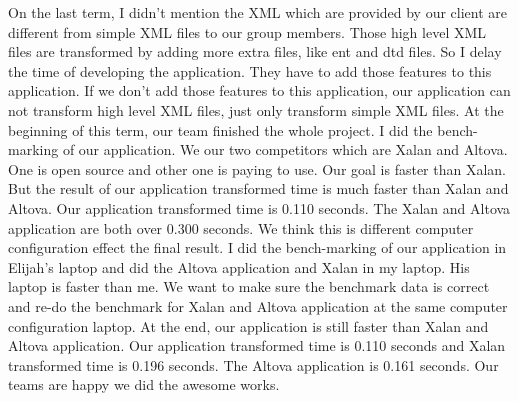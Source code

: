 On the last term, I didn’t mention the XML which are provided by our client are different from simple XML files to our group members.
Those high level XML files are transformed by adding more extra files, like ent and dtd files. 
So I delay the time of developing the application. They have to add those features to this application. 
If we don’t add those features to this application, our application can not transform high level XML files, just only transform simple XML files.
At the beginning of this term, our team finished the whole project. 
I did the bench-marking of our application. 
We our two competitors which are Xalan and Altova. 
One is open source and other one is paying to use. 
Our goal is faster than Xalan. 
But the result of our application transformed time is much faster than Xalan and Altova.
Our application transformed time is 0.110 seconds. 
The Xalan and Altova application are both over 0.300 seconds. 
We think this is different computer configuration effect the final result.
I did the bench-marking of our application in Elijah’s laptop and did the Altova application and Xalan in my laptop. 
His laptop is faster than me. 
We want to make sure the benchmark data is correct and re-do the benchmark for Xalan and Altova application at the same computer configuration laptop. 
At the end, our application is still faster than Xalan and Altova application. 
Our application transformed time is 0.110 seconds and Xalan transformed time is 0.196 seconds. 
The Altova application is 0.161 seconds. Our teams are happy we did the awesome works.
